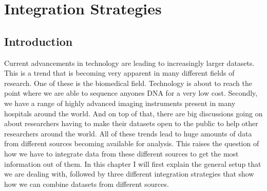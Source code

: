 \chapter{Integration Strategies}
\label{cha:integration}

\section{Introduction}
\label{sec:integration-introduction}
Current advancements in technology are leading to increasingly larger datasets. This is a trend that is becoming very apparent in many different fields of research. One of these is the biomedical field. Technology is about to reach the point where we are able to sequence anyones DNA for a very low cost. Secondly, we have a range of highly advanced imaging instruments present in many hospitals around the world. And on top of that, there are big discussions going on about researchers having to make their datasets open to the public to help other researchers around the world. All of these trends lead to huge amounts of data from different sources becoming available for analysis. This raises the question of how we have to integrate data from these different sources to get the most information out of them. In this chapter I will first explain the general setup that we are dealing with, followed by three different integration strategies that show how we can combine datasets from different sources.

